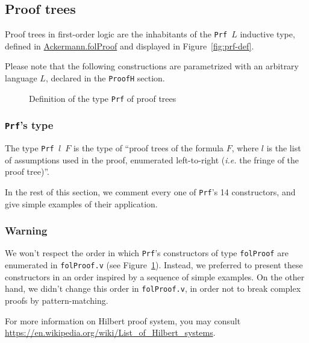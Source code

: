 \subsection{Proof trees}

Proof trees in first-order logic are the inhabitants of the \texttt{Prf $L$} 
inductive type, defined in \href{../theories/html/hydras.Ackermann.folProof.html}{Ackermann.folProof} and displayed in Figure~\vref{fig:prf-def}.





Please note that the following constructions are parametrized with an
arbitrary language $L$, declared in the \texttt{ProofH} section. 


\begin{figure}[p]
  \centering
{}  
  \caption{Definition of the type \texttt{Prf} of proof trees}
  \label{fig:prf-def}
\end{figure}



\subsubsection{\texttt{Prf}'s type}

The type  \texttt{Prf $l$ $F$}  is the type of ``proof trees of the formula $F$, where $l$ is the list of assumptions used in the proof, enumerated left-to-right (\emph{i.e.} the fringe of the proof tree)''. 

In the rest of this section, we comment  every one of 
\texttt{Prf}'s 14 constructors,
 and give simple examples of their application.

\subsubsection{Warning}

We won't respect the order in which \texttt{Prf}'s constructors
of type \texttt{folProof}  
are enumerated in \texttt{folProof.v} (see Figure~\ref{fig:prf-def}). 
Instead, we preferred to present 
these constructors in an order inspired by a sequence
 of simple examples. On the other hand, we didn't change this order in 
\texttt{folProof.v}, in order not to break complex proofs by pattern-matching.

For more information on Hilbert proof system, you may consult
\url{https://en.wikipedia.org/wiki/List_of_Hilbert_systems}.

